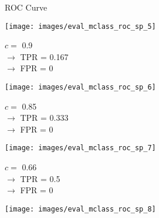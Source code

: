 \documentclass[11pt,compress,t,notes=noshow, xcolor=table]{beamer}
\newenvironment{knitrout}{}{} %
\begin{document}
\begin{vbframe}{ROC Curve}

\begin{knitrout}\scriptsize
{}\color{fgcolor}

{\centering \texttt{[image: images/eval\_mclass\_roc\_sp\_5]} 

}



\end{knitrout}

$c =$ 0.9\\ 
$\rightarrow$ TPR = 0.167 \\
$\rightarrow$ FPR = 0


\framebreak

\begin{knitrout}\scriptsize
{}\color{fgcolor}

{\centering \texttt{[image: images/eval\_mclass\_roc\_sp\_6]} 

}



\end{knitrout}

$c =$ 0.85\\ 
$\rightarrow$ TPR = 0.333 \\
$\rightarrow$ FPR = 0

\framebreak

\begin{knitrout}\scriptsize
{}\color{fgcolor}

{\centering \texttt{[image: images/eval\_mclass\_roc\_sp\_7]} 

}



\end{knitrout}

$c =$ 0.66\\ 
$\rightarrow$ TPR = 0.5 \\
$\rightarrow$ FPR = 0

\framebreak

\begin{knitrout}\scriptsize
{}\color{fgcolor}

{\centering \texttt{[image: images/eval\_mclass\_roc\_sp\_8]}

}




\end{knitrout}
\end{vbframe}
\end{document}
